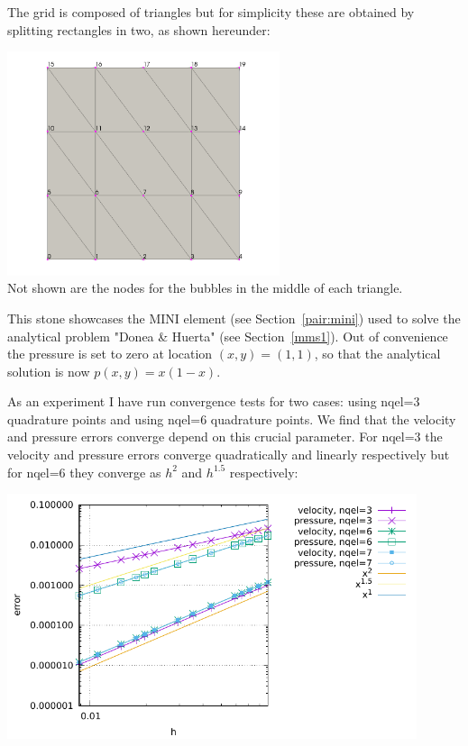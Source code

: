 The grid is composed of triangles but for simplicity these 
are obtained by splitting rectangles in two, as shown hereunder:

\begin{center}
\includegraphics[width=8cm]{python_codes/fieldstone_47/images/minigrid}\\
Not shown are the nodes for the bubbles in the middle of each triangle. 
\end{center}

This stone showcases the MINI element (see Section~\ref{pair:mini})
used to solve the analytical problem "Donea \& Huerta" (see Section~\ref{mms1}).
Out of convenience the pressure is set to zero at location $(x,y)=(1,1)$, so that the 
analytical solution is now $p(x,y)=x(1-x)$. 

As an experiment I have run convergence tests for two cases: using nqel=3 
quadrature points and using nqel=6 quadrature points.
We find that the velocity and pressure errors converge depend on this crucial
parameter. 
For nqel=3 the velocity and pressure errors converge quadratically and linearly respectively
but for nqel=6 they converge as $h^2$ and $h^{1.5}$ respectively:

\begin{center}
\includegraphics[width=12cm]{python_codes/fieldstone_47/images/reg/errors}
\end{center}

